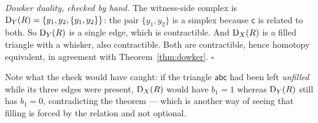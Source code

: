 \begin{center}
\label{fig:K4}
\end{center}

\begin{workedbox}\Worked
\emph{Dowker duality, checked by hand.} The witness-side complex is
$\mathrm{D}_{Y}(R)=\{y_1,y_2,\{y_1,y_2\}\}$: the pair $\{y_1,y_2\}$ is a simplex
because $\mathsf c$ is related to both. So $\mathrm{D}_{Y}(R)$ is a single edge,
which is contractible. And $\mathrm{D}_{X}(R)$ is a filled triangle with a whisker,
also contractible. Both are contractible, hence homotopy equivalent, in
agreement with Theorem~\ref{thm:dowker}. \hfill$\square$

Note what the check would have caught: if the triangle $\mathsf{abc}$ had been
left \emph{unfilled} while its three edges were present, $\mathrm{D}_{X}(R)$ would
have $b_1=1$ whereas $\mathrm{D}_{Y}(R)$ still has $b_1=0$, contradicting the
theorem --- which is another way of seeing that filling is forced by the
relation and not optional.
\end{workedbox}

